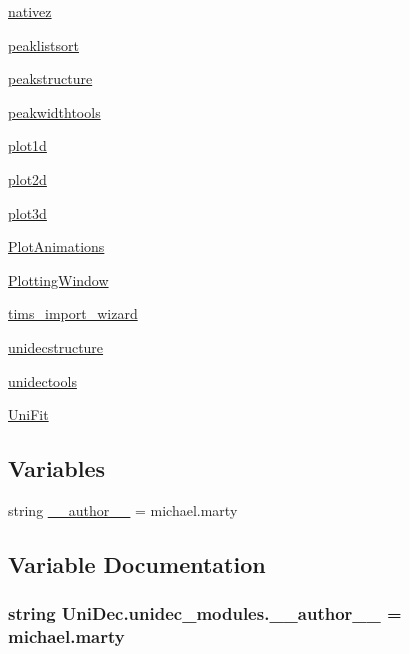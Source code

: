 \begin{DoxyCompactItemize}
\item 
 \hyperlink{namespace_uni_dec_1_1unidec__modules_1_1nativez}{nativez}
\item 
 \hyperlink{namespace_uni_dec_1_1unidec__modules_1_1peaklistsort}{peaklistsort}
\item 
 \hyperlink{namespace_uni_dec_1_1unidec__modules_1_1peakstructure}{peakstructure}
\item 
 \hyperlink{namespace_uni_dec_1_1unidec__modules_1_1peakwidthtools}{peakwidthtools}
\item 
 \hyperlink{namespace_uni_dec_1_1unidec__modules_1_1plot1d}{plot1d}
\item 
 \hyperlink{namespace_uni_dec_1_1unidec__modules_1_1plot2d}{plot2d}
\item 
 \hyperlink{namespace_uni_dec_1_1unidec__modules_1_1plot3d}{plot3d}
\item 
 \hyperlink{namespace_uni_dec_1_1unidec__modules_1_1_plot_animations}{Plot\+Animations}
\item 
 \hyperlink{namespace_uni_dec_1_1unidec__modules_1_1_plotting_window}{Plotting\+Window}
\item 
 \hyperlink{namespace_uni_dec_1_1unidec__modules_1_1tims__import__wizard}{tims\+\_\+import\+\_\+wizard}
\item 
 \hyperlink{namespace_uni_dec_1_1unidec__modules_1_1unidecstructure}{unidecstructure}
\item 
 \hyperlink{namespace_uni_dec_1_1unidec__modules_1_1unidectools}{unidectools}
\item 
 \hyperlink{namespace_uni_dec_1_1unidec__modules_1_1_uni_fit}{Uni\+Fit}
\end{DoxyCompactItemize}
\subsection*{Variables}
\begin{DoxyCompactItemize}
\item 
string \hyperlink{namespace_uni_dec_1_1unidec__modules_adbcb80aefe0c0573e4cba6ed3c42ce91}{\+\_\+\+\_\+author\+\_\+\+\_\+} = \textquotesingle{}michael.\+marty\textquotesingle{}
\end{DoxyCompactItemize}


\subsection{Variable Documentation}
\hypertarget{namespace_uni_dec_1_1unidec__modules_adbcb80aefe0c0573e4cba6ed3c42ce91}{}
\subsubsection[{\+\_\+\+\_\+author\+\_\+\+\_\+}]{\setlength{\rightskip}{0pt plus 5cm}string Uni\+Dec.\+unidec\+\_\+modules.\+\_\+\+\_\+author\+\_\+\+\_\+ = \textquotesingle{}michael.\+marty\textquotesingle{}}\label{namespace_uni_dec_1_1unidec__modules_adbcb80aefe0c0573e4cba6ed3c42ce91}
